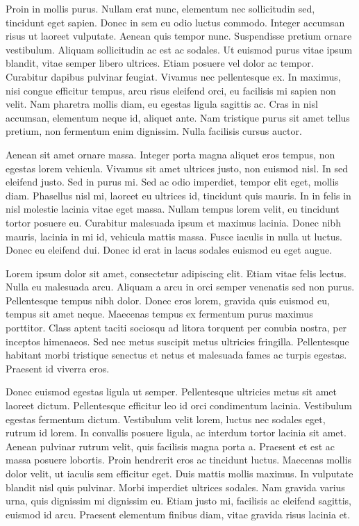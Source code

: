 \documentclass{lowell-prop}
\begin{document}
Proin in mollis purus. Nullam erat nunc, elementum nec sollicitudin sed, tincidunt eget sapien. Donec in sem eu odio luctus commodo. Integer accumsan risus ut laoreet vulputate. Aenean quis tempor nunc. Suspendisse pretium ornare vestibulum. Aliquam sollicitudin ac est ac sodales. Ut euismod purus vitae ipsum blandit, vitae semper libero ultrices. Etiam posuere vel dolor ac tempor. Curabitur dapibus pulvinar feugiat. Vivamus nec pellentesque ex. In maximus, nisi congue efficitur tempus, arcu risus eleifend orci, eu facilisis mi sapien non velit. Nam pharetra mollis diam, eu egestas ligula sagittis ac. Cras in nisl accumsan, elementum neque id, aliquet ante. Nam tristique purus sit amet tellus pretium, non fermentum enim dignissim. Nulla facilisis cursus auctor.

Aenean sit amet ornare massa. Integer porta magna aliquet eros tempus, non egestas lorem vehicula. Vivamus sit amet ultrices justo, non euismod nisl. In sed eleifend justo. Sed in purus mi. Sed ac odio imperdiet, tempor elit eget, mollis diam. Phasellus nisl mi, laoreet eu ultrices id, tincidunt quis mauris. In in felis in nisl molestie lacinia vitae eget massa. Nullam tempus lorem velit, eu tincidunt tortor posuere eu. Curabitur malesuada ipsum et maximus lacinia. Donec nibh mauris, lacinia in mi id, vehicula mattis massa. Fusce iaculis in nulla ut luctus. Donec eu eleifend dui. Donec id erat in lacus sodales euismod eu eget augue.

Lorem ipsum dolor sit amet, consectetur adipiscing elit. Etiam vitae felis lectus. Nulla eu malesuada arcu. Aliquam a arcu in orci semper venenatis sed non purus. Pellentesque tempus nibh dolor. Donec eros lorem, gravida quis euismod eu, tempus sit amet neque. Maecenas tempus ex fermentum purus maximus porttitor. Class aptent taciti sociosqu ad litora torquent per conubia nostra, per inceptos himenaeos. Sed nec metus suscipit metus ultricies fringilla. Pellentesque habitant morbi tristique senectus et netus et malesuada fames ac turpis egestas. Praesent id viverra eros.

Donec euismod egestas ligula ut semper. Pellentesque ultricies metus sit amet laoreet dictum. Pellentesque efficitur leo id orci condimentum lacinia. Vestibulum egestas fermentum dictum. Vestibulum velit lorem, luctus nec sodales eget, rutrum id lorem. In convallis posuere ligula, ac interdum tortor lacinia sit amet. Aenean pulvinar rutrum velit, quis facilisis magna porta a. Praesent et est ac massa posuere lobortis. Proin hendrerit eros ac tincidunt luctus. Maecenas mollis dolor velit, ut iaculis sem efficitur eget. Duis mattis mollis maximus. In vulputate blandit nisl quis pulvinar. Morbi imperdiet ultrices sodales. Nam gravida varius urna, quis dignissim mi dignissim eu. Etiam justo mi, facilisis ac eleifend sagittis, euismod id arcu. Praesent elementum finibus diam, vitae gravida risus lacinia et.
\end{document}
